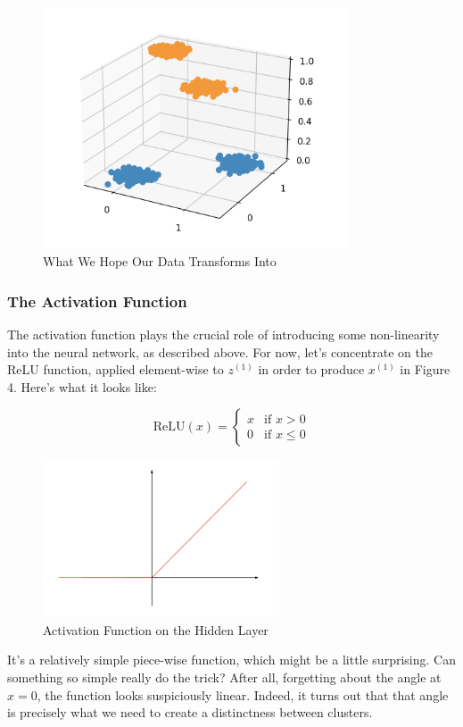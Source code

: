 \documentclass{article}
\begin{document}
\begin{figure}[htp]
    \centering
    \includegraphics[width=9cm]{3d_data.png}
    \caption{What We Hope Our Data Transforms Into}
\end{figure}

\subsubsection{The Activation Function}

The activation function plays the crucial role of introducing some non-linearity into the neural network, as described above. For now, let's concentrate on the ReLU function, applied element-wise to $z^{(1)}$ in order to produce $x^{(1)}$ in Figure 4. Here's what it looks like:

\[\mbox{ReLU}(x) = 
    \begin{cases}
        x & \text{if } x > 0\\
        0 & \text{if } x \leq 0 
    \end{cases}
\]

\begin{figure}[htp]
    \centering
    \includegraphics[width=7cm]{relu.png}
    \caption{Activation Function on the Hidden Layer}
\end{figure}

It's a relatively simple piece-wise function, which might be a little surprising. Can something so simple really do the trick? After all, forgetting about the angle at $x = 0$, the function looks suspiciously linear. Indeed, it turns out that that angle is precisely what we need to create a distinctness between clusters. \\
\end{document}
